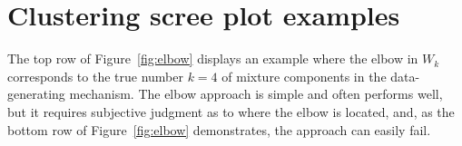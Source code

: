 \documentclass[12pt]{article}
\begin{document}



\appendix

\section{Clustering scree plot examples}

\label{sec:elbow-fail}

The top row of Figure~\ref{fig:elbow}
displays an example where the elbow in $W_k$ corresponds to the true number $k
= 4$ of mixture components in the data-generating mechanism. The elbow
approach is simple and often performs well, but it requires subjective
judgment as to where the elbow is located, and, as the bottom row of
Figure~\ref{fig:elbow} demonstrates, the approach can easily fail.
\end{document}
